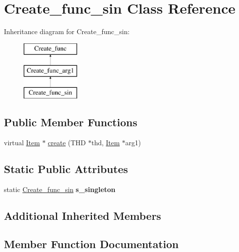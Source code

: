 \hypertarget{classCreate__func__sin}{}\section{Create\+\_\+func\+\_\+sin Class Reference}
\label{classCreate__func__sin}
Inheritance diagram for Create\+\_\+func\+\_\+sin\+:\begin{figure}[H]
\begin{center}
\leavevmode
\includegraphics[height=3.000000cm]{classCreate__func__sin}
\end{center}
\end{figure}
\subsection*{Public Member Functions}
\begin{DoxyCompactItemize}
\item 
virtual \mbox{\hyperlink{classItem}{Item}} $\ast$ \mbox{\hyperlink{classCreate__func__sin_adb0e07a1381181b25451274a5e924d57}{create}} (T\+HD $\ast$thd, \mbox{\hyperlink{classItem}{Item}} $\ast$arg1)
\end{DoxyCompactItemize}
\subsection*{Static Public Attributes}
\begin{DoxyCompactItemize}
\item 
\mbox{\label{classCreate__func__sin_a6f24e0ffc49cfc5fecbedc16df221ee6}} 
static \mbox{\hyperlink{classCreate__func__sin}{Create\+\_\+func\+\_\+sin}} {\bfseries s\+\_\+singleton}
\end{DoxyCompactItemize}
\subsection*{Additional Inherited Members}


\subsection{Member Function Documentation}
\mbox{\label{classCreate__func__sin_adb0e07a1381181b25451274a5e924d57}} 
